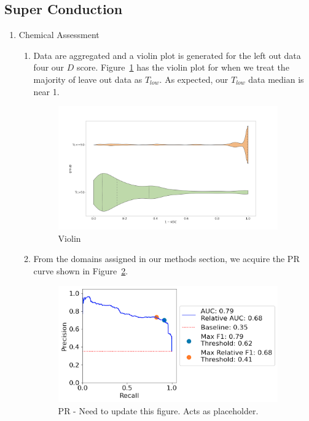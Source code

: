 \subsection{Super Conduction}

\begin{enumerate}
    \item Chemical Assessment
    \begin{enumerate}
        \item Data are aggregated and a violin plot is generated for the left out data four our $D$ score. Figure~\ref{cond_high_chemical} has the violin plot for when we treat the majority of leave out data as $T_{low}$. As expected, our $T_{low}$ data median is near 1. 

        \begin{figure}[H]
        \centering
        \includegraphics[width=0.95\textwidth]{figures/cond_high_chemical.png}
        \caption{Violin}
        \label{cond_high_chemical}
        \end{figure}

        \item From the domains assigned in our methods section, we acquire the PR curve shown in Figure~\ref{cond_high_chemical_pr}.

        \begin{figure}[H]
        \centering
        \includegraphics[width=0.95\textwidth]{figures/cond_high_chemical_pr.png}
        \caption{PR - Need to update this figure. Acts as placeholder.}
        \label{cond_high_chemical_pr}
        \end{figure}
        

\end{enumerate}
\end{enumerate}
